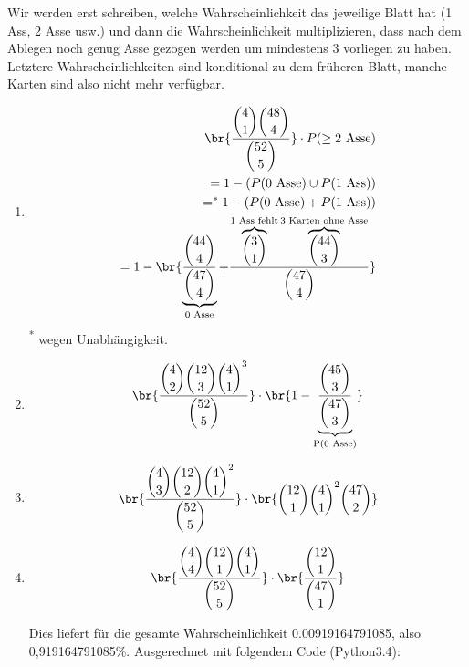 \begin{enumerate}[a)]
  Wir werden erst schreiben, welche Wahrscheinlichkeit das jeweilige Blatt hat (1 Ass, 2 Asse usw.) und dann die Wahrscheinlichkeit multiplizieren, dass nach dem Ablegen noch genug Asse gezogen werden um mindestens 3 vorliegen zu haben. Letztere Wahrscheinlichkeiten sind konditional zu dem früheren Blatt, manche Karten sind also nicht mehr verfügbar.

  \begin{enumerate}[1)]
    \item
      \begin{align*}
        \br{\frac{\dbinom{4}{1} \dbinom{48}{4} }{ \dbinom{52}{5} }} \cdot P(\geq \text{2 Asse}) \\
                                    = 1 - (P(\text{0 Asse}) \cup P(\text{1 Ass}))\\
                                    =^{*} 1 - (P(\text{0 Asse}) + P(\text{1 Ass}))\\
                                    = 1- \br{ \underbrace{\frac{\dbinom{44}{4}}{\dbinom{47}{4}}}_{\text{0 Asse}} +
                                        \frac{ \overbrace{\dbinom{3}{1}}^{\text{1 Ass fehlt}} \overbrace{\dbinom{44}{3}}^{\text{3 Karten ohne Asse}}}{ \dbinom{47}{4} } }\\
      \end{align*}
      \textsuperscript{*} wegen Unabhängigkeit.
    \item
      \begin{align*}
        \br{ \frac{ \dbinom{4}{2} \dbinom{12}{3} \dbinom{4}{1}^{3} }{ \dbinom{52}{5} }  }
                \cdot \br{ 1 - \underbrace{\frac{ \dbinom{45}{3} }{\dbinom{47}{3} }}_{\text{P(0 Asse)}} }
      \end{align*}

    \item
      \begin{align*}
        \br{ \frac{ \dbinom{4}{3} \dbinom{12}{2} \dbinom{4}{1}^{2} }{\dbinom{52}{5}} }
          \cdot \br{ \dbinom{12}{1} \dbinom{4}{1}^{2}{\dbinom{47}{2}} }
      \end{align*}
    \item
      \begin{align*}
        \br{ \frac{ \dbinom{4}{4} \dbinom{12}{1} \dbinom{4}{1} }{\dbinom{52}{5}} }
            \cdot \br{\frac{\dbinom{12}{1}}{\dbinom{47}{1}}}
      \end{align*}

    Dies liefert für die gesamte Wahrscheinlichkeit 0.00919164791085, also 0,919164791085\%.
    Ausgerechnet mit folgendem Code (Python3.4):


\end{enumerate}
\end{enumerate}
